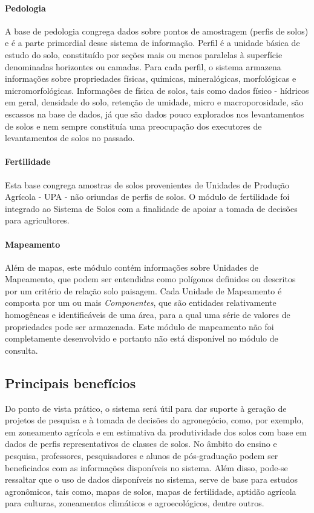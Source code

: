 \paragraph{Pedologia} A base de pedologia congrega dados sobre pontos de amostragem (perfis de solos) e é a parte primordial desse sistema de informação. Perfil é a unidade básica de estudo do solo, constituído por seções mais ou menos paralelas à superfície denominadas horizontes ou camadas. Para cada perfil, o sistema armazena informações sobre propriedades físicas, químicas, mineralógicas, morfológicas e micromorfológicas. Informações de física de solos, tais como dados físico - hídricos em geral, densidade do solo, retenção de umidade, micro e macroporosidade, são escassos na base de dados, já que são dados pouco explorados nos levantamentos de solos e nem sempre constituía uma preocupação dos executores de  levantamentos de solos no passado.

\paragraph{Fertilidade} Esta base congrega amostras de solos provenientes de Unidades de Produção Agrícola - UPA - não oriundas de perfis de solos. O módulo de fertilidade foi integrado ao Sistema de Solos com a finalidade de apoiar a tomada de decisões para agricultores.

\paragraph{Mapeamento} Além de mapas, este módulo contém informações sobre Unidades de Mapeamento, que podem ser entendidas como polígonos definidos ou descritos por um critério de relação solo paisagem. Cada Unidade de Mapeamento é composta por um ou mais \textit{Componentes}, que são entidades relativamente homogêneas e identificáveis de uma área, para a qual uma série de valores de propriedades pode ser armazenada. Este módulo de mapeamento não foi completamente desenvolvido e portanto não está disponível no módulo de consulta.

\subsection{Principais benefícios}

Do ponto de vista prático, o sistema será útil para dar suporte à geração de projetos de pesquisa e à tomada de decisões do agronegócio, como, por exemplo, em zoneamento agrícola e em estimativa da produtividade dos solos com base em dados de perfis representativos de classes de solos. No âmbito do ensino e pesquisa, professores, pesquisadores e alunos de pós-graduação podem ser beneficiados com as informações disponíveis no sistema. Além disso, pode-se ressaltar que o uso de dados disponíveis no sistema, serve de base para estudos agronômicos, tais como, mapas de solos, mapas de fertilidade, aptidão agrícola para culturas, zoneamentos climáticos e agroecológicos, dentre outros.

